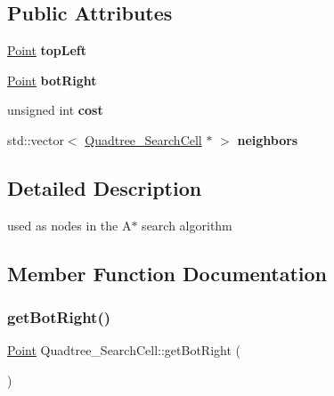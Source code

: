 \subsection*{Public Attributes}
\begin{DoxyCompactItemize}
\item 
\mbox{\label{classQuadtree__SearchCell_a5364a5cc75d4eaaafdd2e96a679b8073}} 
\hyperlink{structPoint}{Point} {\bfseries top\+Left}
\item 
\mbox{\label{classQuadtree__SearchCell_a39b17158a3eca5ba37dc5f850a1283d5}} 
\hyperlink{structPoint}{Point} {\bfseries bot\+Right}
\item 
\mbox{\label{classQuadtree__SearchCell_a6377f42344a7108ec70768b2f8ebe83e}} 
unsigned int {\bfseries cost}
\item 
\mbox{\label{classQuadtree__SearchCell_ae633f7a72335bb2c13420667bb34ec1c}} 
std\+::vector$<$ \hyperlink{classQuadtree__SearchCell}{Quadtree\+\_\+\+Search\+Cell} $\ast$ $>$ {\bfseries neighbors}
\end{DoxyCompactItemize}


\subsection{Detailed Description}
used as nodes in the A$\ast$ search algorithm 

\subsection{Member Function Documentation}
\mbox{\label{classQuadtree__SearchCell_aa05145ed327cd4043027ea7d0dc05006}} 
\subsubsection{\texorpdfstring{get\+Bot\+Right()}{getBotRight()}}
{\footnotesize\ttfamily \hyperlink{structPoint}{Point} Quadtree\+\_\+\+Search\+Cell\+::get\+Bot\+Right (\begin{DoxyParamCaption}{ }\end{DoxyParamCaption})}



